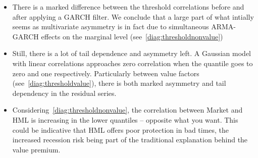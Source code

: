 \begin{itemize}
  \item There is a marked difference between the threshold correlations before and after applying a GARCH filter. We conclude that a large part of what intially seems as multivariate asymmetry is in fact due to simultaneous ARMA-GARCH effects on the marginal level (see~\autoref{diag:thresholdnonvalue})
  \item Still, there is a lot of tail dependence and asymmetry left. A Gaussian model with linear correlations approaches zero correlation when the quantile goes to zero and one respectively. Particularly between value factors (see~\autoref{diag:thresholdvalue}), there is both marked asymmetry and tail dependency in the residual series.
  \item Considering~\autoref{diag:thresholdnonvalue}, the correlation between Market and HML is increasing in the lower quantiles -- opposite what you want. This could be indicative that HML offers poor protection in bad times, the increased recession risk being part of the traditional explanation behind the value premium.
\end{itemize}
